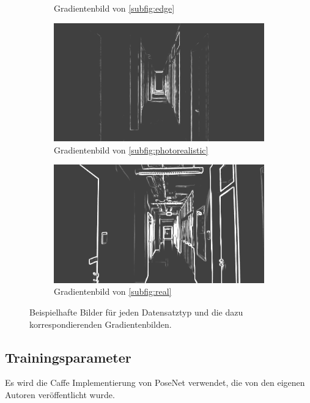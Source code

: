 \begin{figure}[htp]
\begin{subfigure}[t]{0.24\linewidth}
		\caption{Gradientenbild  \hspace{1cm} von \ref{subfig:edge}}
	\end{subfigure}
	\hfill
	\begin{subfigure}[t]{0.24\linewidth}
		\centering
		\includegraphics[width=\linewidth]{images/syn_dataset/cg00708.png}
		\caption{Gradientenbild  \hspace{1cm} von \ref{subfig:photorealistic}}
	\end{subfigure}
	\begin{subfigure}[t]{0.24\linewidth}
		\centering
		\includegraphics[width=\linewidth]{images/syn_dataset/rg000305.png}
		\caption{Gradientenbild  \hspace{1cm} von \ref{subfig:real}}
	\end{subfigure}
	\hfill
	\caption{Beispielhafte Bilder für jeden Datensatztyp und die dazu korrespondierenden Gradientenbilden.}
	\label{fig:dataset_preprocess}
\end{figure}
\vspace{\fill}

\subsection{Trainingsparameter}
Es wird die Caffe Implementierung \cite{jiaCaffeConvolutionalArchitecture2014} von PoseNet verwendet, die von den eigenen Autoren \citet{kendallPoseNetConvolutionalNetwork2015} veröffentlicht wurde.

